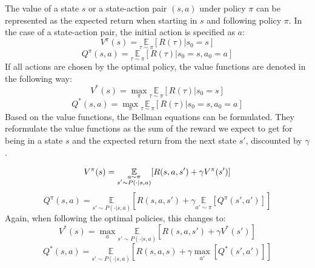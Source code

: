 The value of a state $s$ or a state-action pair $(s, a)$ under policy $\pi$ can be represented as the expected return when starting in $s$ and following policy $\pi$. In the case of a state-action pair, the initial action is specified as $a$:
\begin{equation}
    V^\pi(s)=\underset{\tau\sim\pi}{\mathbb{E}}[R(\tau)|s_0=s]
\end{equation}
\begin{equation}
    Q^\pi(s,a)=\underset{\tau\sim\pi}{\mathbb{E}}[R(\tau)|s_0=s, a_0=a]
\end{equation}
If all actions are chosen by the optimal policy, the value functions are denoted in the following way:
\begin{equation}
    V^*(s)=\underset{\pi}{\max}\underset{\tau\sim\pi}{\mathbb{E}}[R(\tau)|s_0=s]
\end{equation}
\begin{equation}
    Q^*(s,a)=\underset{\pi}{\max}\underset{\tau\sim\pi}{\mathbb{E}}[R(\tau)|s_0=s, a_0=a]
\end{equation}
Based on the value functions, the Bellman equations can be formulated. They reformulate the value functions as the sum of the reward we expect to get for being in a state $s$ and the expected return from the next state $s'$, discounted by $\gamma$.


\begin{equation}
    V^\pi(s)=\underset{\begin{subarray}{c}
        a\sim\pi\\
        s'\sim P(\cdot|s,a)
    \end{subarray}}{\mathbb{E}}[R(s,a,s')+\gamma V^\pi(s')]
\end{equation}
\begin{equation}
    Q^\pi(s,a)=\underset{s'\sim P(\cdot|s,a)}{\mathbb{E}}[R(s,a,s')+\gamma \underset{a'\sim\pi}{\mathbb{E}}[Q^\pi(s',a')]]
\end{equation}
Again, when following the optimal policies, this changes to:\begin{equation}
    V^*(s)=\underset{a}{\max}\underset{s'\sim P(\cdot|s,a)}{\mathbb{E}}[R(s,a,s')+\gamma V^*(s')]
\end{equation}
\begin{equation}
    Q^*(s,a)=\underset{s'\sim P(\cdot|s,a)}{\mathbb{E}}[R(s,a,s)+\gamma \underset{a'}{\max}[Q^*(s',a')]]
\end{equation}


